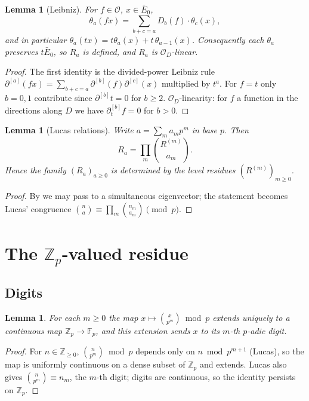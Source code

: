 \documentclass[11pt,reqno]{amsart}
\newcommand{\Zp}{\mathbb{Z}_p}
\newcommand{\Fp}{\mathbb{F}_p}
\newcommand{\ZZ}{\mathbb{Z}}
\newcommand{\cO}{\mathcal{O}}
\theoremstyle{plain}
\newtheorem{lemma}[theorem]{Lemma}
\theoremstyle{definition}
\theoremstyle{remark}
\numberwithin{equation}{section}
\begin{document}
\begin{lemma}[Leibniz]\label{lem:leibniz}
For $f\in\cO$, $x\in\bar E_0$,
\[
   \theta_a(fx)=\sum_{b+c=a}D_b(f)\cdot\theta_c(x),
\]
and in particular $\theta_a(tx)=t\theta_a(x)+t\,\theta_{a-1}(x)$.
Consequently each $\theta_a$ preserves $t\bar E_0$, so $R_a$ is defined,
and $R_a$ is $\cO_D$-linear.
\end{lemma}
\begin{proof}
The first identity is the divided-power Leibniz rule
$\partial^{[a]}(fx)=\sum_{b+c=a}\partial^{[b]}(f)\partial^{[c]}(x)$
multiplied by $t^a$.  For $f=t$ only $b=0,1$ contribute since
$\partial^{[b]}t=0$ for $b\ge2$.  $\cO_D$-linearity: for $f$ a function in
the directions along $D$ we have $\partial_t^{[b]}f=0$ for $b>0$.
\end{proof}

\begin{lemma}[Lucas relations]\label{lem:lucas}
Write $a=\sum_m a_mp^m$ in base $p$.  Then
\[
   R_a=\prod_{m}\binom{R^{(m)}}{a_m}.
\]
Hence the family $(R_a)_{a\ge0}$ is determined by the level residues
$(R^{(m)})_{m\ge0}$.
\end{lemma}
\begin{proof}
By  we may pass to a simultaneous eigenvector; the
statement becomes Lucas' congruence
$\binom na\equiv\prod_m\binom{n_m}{a_m}\pmod p$.
\end{proof}

\section{The $\Zp$-valued residue}\label{sec:residue}

\subsection{Digits}
\begin{lemma}\label{lem:digitmap}
For each $m\ge0$ the map $x\mapsto\binom{x}{p^m}\bmod p$ extends
uniquely to a continuous map $\Zp\to\Fp$, and this extension sends $x$ to
its $m$-th $p$-adic digit.
\end{lemma}
\begin{proof}
For $n\in\ZZ_{\ge0}$, $\binom{n}{p^m}\bmod p$ depends only on
$n\bmod p^{m+1}$ (Lucas), so the map is uniformly continuous on a dense
subset of $\Zp$ and extends.  Lucas also gives
$\binom{n}{p^m}\equiv n_m$, the $m$-th digit; digits are continuous, so
the identity persists on $\Zp$.
\end{proof}
\end{document}
